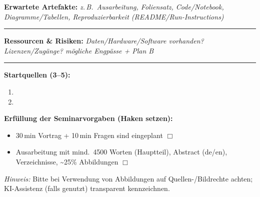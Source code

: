 \textbf{Erwartete Artefakte:} \emph{z.\,B.\ Ausarbeitung, Foliensatz, Code/Notebook, Diagramme/Tabellen, Reproduzierbarkeit (README/Run-Instructions)}\\
\rule{\textwidth}{0.6pt}

\textbf{Ressourcen \& Risiken:} \emph{Daten/Hardware/Software vorhanden? Lizenzen/Zugänge? mögliche Engpässe + Plan B}\\
\rule{\textwidth}{0.6pt}

\textbf{Startquellen (3–5):}
\begin{enumerate}\itemsep0.1em
  \item 
  \item 
\end{enumerate}

\textbf{Erfüllung der Seminarvorgaben (Haken setzen):}
\begin{itemize}\itemsep0.1em
  \item 30\,min Vortrag + 10\,min Fragen sind eingeplant \hfill $\Box$
  \item Ausarbeitung mit mind.\ 4500 Worten (Hauptteil), Abstract (de/en), Verzeichnisse, \textasciitilde25\% Abbildungen \hfill $\Box$
\end{itemize}

\textit{Hinweis:} Bitte bei Verwendung von Abbildungen auf Quellen-/Bildrechte achten; KI-Assistenz (falls genutzt) transparent kennzeichnen.

\endgroup
\newpage
